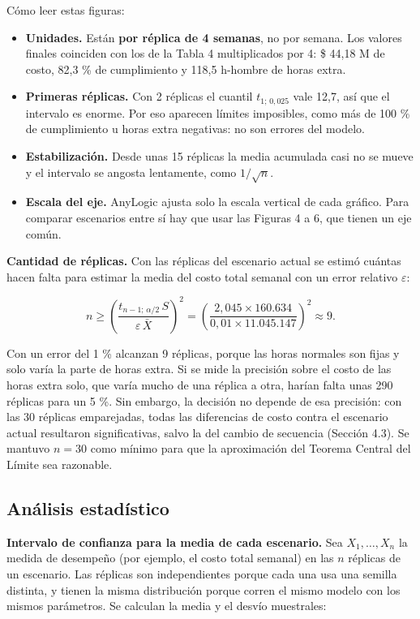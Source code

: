 \documentclass[11pt,a4paper]{article}
\begin{document}
Cómo leer estas figuras:

\begin{itemize}
\item \textbf{Unidades.} Están \textbf{por réplica de 4 semanas}, no por semana. Los valores finales coinciden con los de la Tabla 4 multiplicados por 4: \$ 44,18 M de costo, 82,3 \% de cumplimiento y 118,5 h-hombre de horas extra.
\item \textbf{Primeras réplicas.} Con 2 réplicas el cuantil $t_{1;\,0{,}025}$ vale 12,7, así que el intervalo es enorme. Por eso aparecen límites imposibles, como más de 100 \% de cumplimiento u horas extra negativas: no son errores del modelo.
\item \textbf{Estabilización.} Desde unas 15 réplicas la media acumulada casi no se mueve y el intervalo se angosta lentamente, como $1/\sqrt{n}$.
\item \textbf{Escala del eje.} AnyLogic ajusta solo la escala vertical de cada gráfico. Para comparar escenarios entre sí hay que usar las Figuras 4 a 6, que tienen un eje común.
\end{itemize}

\textbf{Cantidad de réplicas.} Con las réplicas del escenario actual se estimó cuántas hacen falta para estimar la media del costo total semanal con un error relativo $\varepsilon$:

\[n \ge \left( \frac{t_{n-1;\,\alpha/2}\, S}{\varepsilon\, \bar{X}} \right)^2 = \left( \frac{2{,}045 \times 160.634}{0{,}01 \times 11.045.147} \right)^2 \approx 9 .\]

Con un error del 1 \% alcanzan 9 réplicas, porque las horas normales son fijas y solo varía la parte de horas extra. Si se mide la precisión sobre el costo de las horas extra solo, que varía mucho de una réplica a otra, harían falta unas 290 réplicas para un \textpm{}5 \%. Sin embargo, la decisión no depende de esa precisión: con las 30 réplicas emparejadas, todas las diferencias de costo contra el escenario actual resultaron significativas, salvo la del cambio de secuencia (Sección 4.3). Se mantuvo $n = 30$ como mínimo para que la aproximación del Teorema Central del Límite sea razonable.

\subsection{Análisis estadístico}

\textbf{Intervalo de confianza para la media de cada escenario.} Sea $X_1, \dots, X_n$ la medida de desempeño (por ejemplo, el costo total semanal) en las $n$ réplicas de un escenario. Las réplicas son independientes porque cada una usa una semilla distinta, y tienen la misma distribución porque corren el mismo modelo con los mismos parámetros. Se calculan la media y el desvío muestrales:
\end{document}
